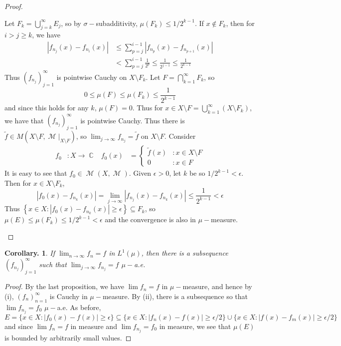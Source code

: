 \documentclass[11pt, a4paper]{memoir}
\DeclareMathOperator{\C}{{\mathbb{C}}}
\newcommand{\abs}[1]{\ensuremath{\left\lvert#1\right\rvert}}
\theoremstyle{change}
\newtheorem{corollary}[theorem]{Corollary.}
\theoremstyle{plain}
\theoremstyle{nonumberplain}
\newtheorem{proof}{Proof}
\DeclareMathOperator{\M}{{\mathcal{M}}}
\numberwithin{equation}{section}
\begin{document}
\begin{proof}
\begin{enumerate}[nolistsep,label=(\roman*)]
            Let $F_k=\bigcup_{j=k}^\infty E_j$, so by $\sigma-$subadditivity, $\mu(F_k)\leq 1/2^{k-1}$.
            If $x\notin F_k$, then for $i>j\geq k$, we have
            \begin{align*}
                \abs{f_{n_j}(x)-f_{n_i}(x)} &\leq\sum\limits_{p=j}^{i-1}\abs{f_{n_p}(x)-f_{n_{p+1}}(x)}\\
                                            &< \sum\limits_{p=j}^{i-1}\frac{1}{2^p}\leq \frac{1}{2^{j-1}}\leq\frac{1}{2^{k-1}}
            \end{align*}
            Thus $(f_{n_j})_{j=1}^\infty$ is pointwise Cauchy on $X\setminus F_k$.
            Let $F=\bigcap_{k=1}^\infty F_k$, so
            \begin{equation*}
                0\leq \mu(F)\leq\mu(F_k)\leq\frac{1}{2^{k-1}}
            \end{equation*}
            and since this holds for any $k$, $\mu(F)=0$.
            Thus for $x\in X\setminus F=\bigcup_{k=1}^\infty(X\setminus F_k)$, we have that $(f_{n_j})_{j=1}^\infty$ is pointwise Cauchy.
            Thus there is $\tilde f\in M(X\setminus F,\M|_{X\setminus F})$, so $\lim_{j\to\infty}f_{n_j}=\tilde f$ on $X\setminus F$.
            Consider
            \begin{align*}
                f_0&:X\to\C & f_0(x)&=\begin{cases}\tilde f(x)&:x\in X\setminus F\\0 &: x\in F\end{cases}
            \end{align*}
            It is easy to see that $f_0\in \M(X,\M)$.
            Given $\epsilon>0$, let $k$ be so $1/2^{k-1}<\epsilon$.
            Then for $x\in X\setminus F_k$,
            \begin{equation*}
                \abs{f_0(x)-f_{n_k}(x)}=\lim_{j\to\infty}\abs{f_{n_j}(x)-f_{n_k}(x)}\leq\frac{1}{2^{k-1}}<\epsilon
            \end{equation*}
            Thus $\left\{x\in X:\abs{f_0(x)-f_{n_k}(x)}\geq\epsilon\right\}\subseteq F_k$, so $\mu(E)\leq\mu(F_k)\leq1/2^{k-1}<\epsilon$ and the convergence is also in $\mu-$measure.
    \end{enumerate}
\end{proof}
\begin{corollary}
    If $\lim_{n\to\infty}f_n=f$ in $L^1(\mu)$, then there is a subsequence $(f_{n_j})_{j=1}^\infty$ such that $\lim_{j\to\infty}f_{n_j}=f$ $\mu-$a.e.
\end{corollary}
\begin{proof}
    By the last proposition, we have $\lim f_n=f$ in $\mu-$measure, and hence by (i), $(f_n)_{n=1}^\infty$ is Cauchy in $\mu-$measure.
    By (ii), there is a subsequence so that $\lim f_{n_j}=f_0$ $\mu-$a.e.
    As before,
    \begin{equation*}
        E=\{x\in X:|f_0(x)-f(x)|\geq\epsilon\}\subseteq\{x\in X:|f_n(x)-f(x)|\geq\epsilon/2\}\cup\{x\in X:|f(x)-f_m(x)|\geq\epsilon/2\}
    \end{equation*}
    and since $\lim f_n=f$ in measure and $\lim f_{n_j}=f_0$ in measure, we see that $\mu(E)$ is bounded by arbitrarily small values.
\end{proof}
\end{document}
